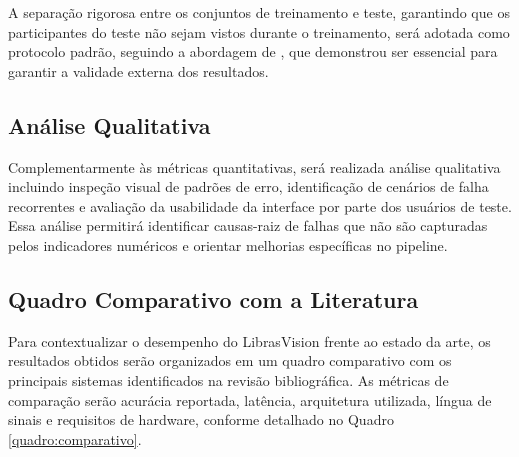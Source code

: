 A separação rigorosa entre os conjuntos de treinamento e teste, garantindo que os participantes do teste não sejam vistos durante o treinamento, será adotada como protocolo padrão, seguindo a abordagem de , que demonstrou ser essencial para garantir a validade externa dos resultados.

\subsection{Análise Qualitativa}

Complementarmente às métricas quantitativas, será realizada análise qualitativa incluindo inspeção visual de padrões de erro, identificação de cenários de falha recorrentes e avaliação da usabilidade da interface por parte dos usuários de teste. Essa análise permitirá identificar causas-raiz de falhas que não são capturadas pelos indicadores numéricos e orientar melhorias específicas no pipeline.

\subsection{Quadro Comparativo com a Literatura}

Para contextualizar o desempenho do LibrasVision frente ao estado da arte, os resultados obtidos serão organizados em um quadro comparativo com os principais sistemas identificados na revisão bibliográfica. As métricas de comparação serão acurácia reportada, latência, arquitetura utilizada, língua de sinais e requisitos de hardware, conforme detalhado no Quadro \ref{quadro:comparativo}.

